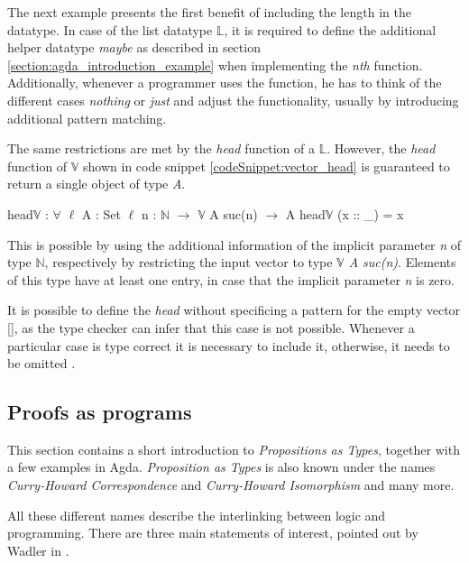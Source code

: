 The next example presents the first benefit of including the length in the datatype.
In case of the list datatype $\mathbb{L}$, it is required to define the additional helper datatype \emph{maybe} as described in section \ref{section:agda_introduction_example} when implementing the \emph{nth} function.
Additionally, whenever a programmer uses the function, he has to think of the different cases \emph{nothing} or \emph{just} and adjust the functionality, usually by introducing additional pattern matching. 

The same restrictions are met by the \emph{head} function of a $\mathbb{L}$. 
However, the \emph{head} function of $\mathbb{V}$ shown in code snippet \ref{codeSnippet:vector_head} is guaranteed to return a single object of type \emph{A}.

\begin{codesnippet}[mathescape=true, caption={$head\mathbb{V}$ function for vectors}, label={codeSnippet:vector_head}]
head$\mathbb{V}$ : $\forall$ {$\ell$} {A : Set $\ell$} {n : $\mathbb{N}$} $\rightarrow$ 
        $\mathbb{V}$ A suc(n) $\rightarrow$ A
head$\mathbb{V}$ (x :: _) = x
\end{codesnippet}

This is possible by using the additional information of the implicit parameter \emph{n} of type $\mathbb{N}$, respectively by restricting the input vector to type \emph{$\mathbb{V}$ A suc(n)}.
Elements of this type have at least one entry, in case that the implicit parameter \emph{n} is zero.

It is possible to define the \emph{head} without specificing a pattern for the empty vector [], as the type checker can infer that this case is not possible.
Whenever a particular case is type correct it is necessary to include it, otherwise, it needs to be omitted \cite{norell:deptyped}.

\subsection{Proofs as programs}\label{section:agda_proofs}
This section contains a short introduction to \emph{Propositions as Types}\cite{10.1145/2699407}, together with a few examples in Agda. 
\emph{Proposition as Types} is also known under the names \emph{Curry-Howard Correspondence}\cite{10.5555/1076265} and \emph{Curry-Howard Isomorphism}\cite{10.1145/2841316} and many more.

All these different names describe the interlinking between logic and programming.
There are three main statements of interest, pointed out by Wadler in \cite{10.1145/2699407}.

